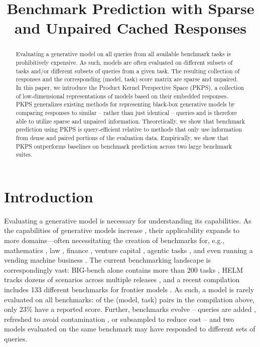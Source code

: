 \documentclass{article}
\title{Benchmark Prediction with Sparse and Unpaired Cached Responses}
\theoremstyle{definition}
\theoremstyle{plain}
\newcommand{\PKPS}{PKPS\xspace}
\begin{document}
\maketitle

\begin{abstract}
Evaluating a generative model on all queries from all available benchmark tasks is
prohibitively expensive. As such, models are often evaluated on different subsets of tasks
and/or different subsets of queries from a given task. The resulting collection of
responses and the corresponding (model, task) score matrix are sparse and unpaired. In
this paper, we introduce the Product Kernel Perspective Space (\PKPS), a collection of
low-dimensional representations of models based on their embedded responses. \PKPS
generalizes existing methods for representing black-box generative models by comparing responses to similar -- rather than just
identical -- queries and is therefore able to utilize sparse and unpaired information. Theoretically, we show that
benchmark prediction using \PKPS is query-efficient relative to methods that only use information from dense and paired portions of the evaluation data.
Empirically, we show that \PKPS
outperforms baselines on benchmark prediction across two large benchmark suites.
\end{abstract}

\section{Introduction}
\label{sec:introduction}
Evaluating a generative model is necessary for understanding its capabilities.
As the capabilities of generative models increase \citep{wei2022emergent, bubeck2023sparks},
their applicability expands to more domains---often necessitating the creation of benchmarks for, e.g., mathematics \citep{hendrycks2021math}, law
\citep{guha2023legalbench}, finance \citep{islam2023financebench}, venture capital
\citep{chen2025vcbench}, agentic tasks \citep{liu2023agentbench}, and even running a
vending machine business \citep{backlund2025vendingbench}.
The current benchmarking landscape is correspondingly vast: BIG-bench alone contains
more than 200 tasks \citep{srivastava2023beyond}, HELM tracks dozens of scenarios
across multiple releases \citep{helm}, and a recent compilation includes 133 different
benchmarks for frontier models \citep{benchpress}.
As such, a model is rarely evaluated on all benchmarks: of the (model, task) pairs in
the compilation above, only 23\% have a reported score.
Further, benchmarks evolve -- queries are added \citep{chollet2025arcagi2}, refreshed to avoid contamination
\citep{white2024livebench}, or subsampled to reduce cost
\citep{perlitz2024efficient} -- and two models evaluated on the same benchmark may have responded to different sets of queries.
\end{document}
